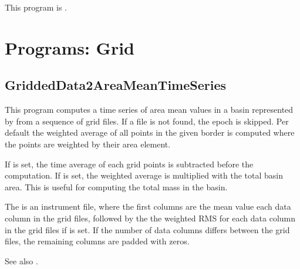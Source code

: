 This program is .
\clearpage
\section{Programs: Grid}
\subsection{GriddedData2AreaMeanTimeSeries}\label{GriddedData2AreaMeanTimeSeries}
This program computes a time series of area mean values
in a basin represented by  from a sequence of grid files.
If a file is not found, the epoch is skipped. Per default
the weighted average of all points in the given border is computed where the points are weighted by their area element.

If  is set, the time average of each grid points is subtracted before the computation.
If  is set, the weighted average is multiplied with the total basin area.
This is useful for computing the total mass in the basin.

The  is an instrument file, where the first columns are the
mean value each data column in the grid files, followed by the the weighted RMS
for each data column in the grid files if  is set.
If the number of data columns differs between the grid files, the remaining columns are padded with zeros.

See also .


